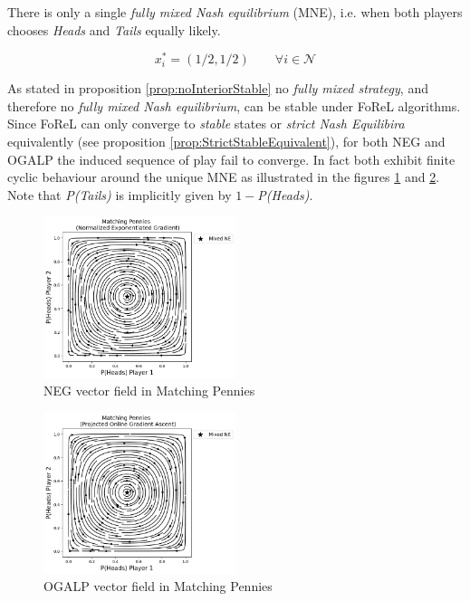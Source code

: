 There is only a single \textit{fully mixed Nash equilibrium} (MNE), i.e. when both players chooses \textit{Heads} and \textit{Tails} equally likely. 

\begin{equation*}
    x_{i}^{*} = (1/2,1/2) \qquad \forall i \in \mathcal{N}
\end{equation*}

As stated in proposition \ref{prop:noInteriorStable} no \textit{fully mixed strategy}, and therefore no \textit{fully mixed Nash equilibrium}, can be stable under FoReL algorithms. Since FoReL can only converge to \textit{stable} states or \textit{strict Nash Equilibira} equivalently (see proposition \ref{prop:StrictStableEquivalent}), for both NEG and OGALP the induced sequence of play fail to converge. In fact both exhibit finite cyclic behaviour around the unique MNE as illustrated in the figures \ref{fig:Pennies1} and \ref{fig:Pennies2}. Note that \textit{P(Tails)} is implicitly given by $1 -$\textit{P(Heads)}. 

\begin{figure}[H]
    \centering
    \includegraphics[width=0.5\textwidth]{logos/Pennies1.png}
    \caption{NEG vector field in Matching Pennies}
    \label{fig:Pennies1}
\end{figure}

\begin{figure}[H]
    \centering
    \includegraphics[width=0.5\textwidth]{logos/Pennies2.png}
    \caption{OGALP vector field in Matching Pennies}
    \label{fig:Pennies2}
\end{figure}

